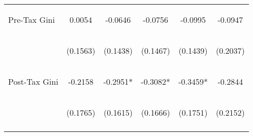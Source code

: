 \begin{center}
\begin{tabular}{lccccc}
\noalign{\smallskip}Pre-Tax Gini & \begin{scriptsize}0.0054\end{scriptsize} & \begin{scriptsize}-0.0646\end{scriptsize} & \begin{scriptsize}-0.0756\end{scriptsize} & \begin{scriptsize}-0.0995\end{scriptsize} & \begin{scriptsize}-0.0947\end{scriptsize}\\
 & \begin{scriptsize}(0.1563)\end{scriptsize} & \begin{scriptsize}(0.1438)\end{scriptsize} & \begin{scriptsize}(0.1467)\end{scriptsize} & \begin{scriptsize}(0.1439)\end{scriptsize} & \begin{scriptsize}(0.2037)\end{scriptsize}\\
\noalign{\smallskip}Post-Tax Gini & \begin{scriptsize}-0.2158\end{scriptsize} & \begin{scriptsize}-0.2951*\end{scriptsize} & \begin{scriptsize}-0.3082*\end{scriptsize} & \begin{scriptsize}-0.3459*\end{scriptsize} & \begin{scriptsize}-0.2844\end{scriptsize}\\
 & \begin{scriptsize}(0.1765)\end{scriptsize} & \begin{scriptsize}(0.1615)\end{scriptsize} & \begin{scriptsize}(0.1666)\end{scriptsize} & \begin{scriptsize}(0.1751)\end{scriptsize} & \begin{scriptsize}(0.2152)\end{scriptsize}\\
\noalign{\smallskip}\hline\end{tabular}\\
\end{center}
